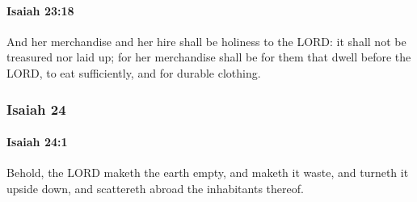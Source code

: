 		\paragraph{Isaiah 23:18} %
			\label{ISAIAH-23-18}

			And her merchandise and her hire shall be holiness to the LORD: it shall not be treasured nor laid up; for her merchandise shall be for them that dwell before the LORD, to eat sufficiently, and for durable clothing.

	\subsubsection{Isaiah 24} %
		\label{ISAIAH-24}

		\paragraph{Isaiah 24:1} %
			\label{ISAIAH-24-1}

			Behold, the LORD maketh the earth empty, and maketh it waste, and turneth it upside down, and scattereth abroad the inhabitants thereof.

